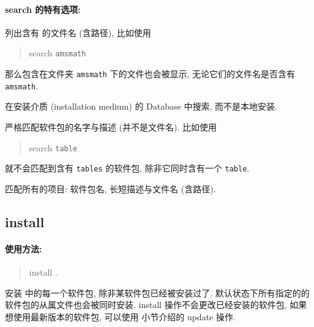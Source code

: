 \paragraph{{\mdseries\ac{search}} 的特有选项:}
\begin{description}
    \item {}\par
    列出含有  的文件名 (含路径), 比如使用
    \begin{quote}
        \tlmgr{} \ac{search}  \texttt{amsmath}
    \end{quote} 
    那么包含在文件夹 \texttt{amsmath} 下的文件也会被显示, 无论它们的文件名是否含有 \texttt{amsmath}. 
    \item {}\par
    在安装介质 (installation medium) 的 \tl{} Database 中搜索, 而不是本地安装. 
    \item {}\par
    严格匹配软件包的名字与描述 (并不是文件名). 比如使用
    \begin{quote}
        \tlmgr{} \ac{search}  \texttt{table}
    \end{quote}
    就不会匹配到含有 \texttt{tables} 的软件包, 除非它同时含有一个 \texttt{table}.
    \item {}\par
    匹配所有的项目: 软件包名, 长短描述与文件名 (含路径). 
\end{description}

\clearpage

\subsection{\mdseries\ac{install}}
\paragraph{使用方法:}
\begin{quote}
    \tlmgr{} \ac{install} .
\end{quote}

安装  中的每一个软件包, 除非某软件包已经被安装过了. 默认状态下所有指定的的软件包的从属文件也会被同时安装. \ac{install} 操作不会更改已经安装的软件包, 如果想使用最新版本的软件包, 可以使用  小节介绍的 \ac{update} 操作. 

